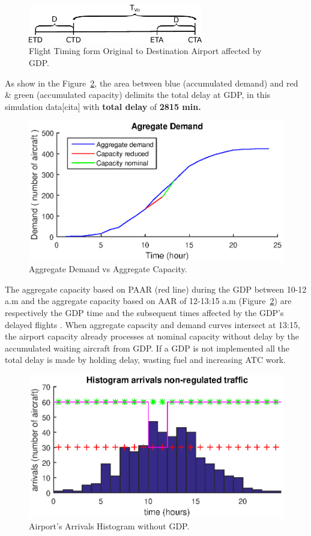 \documentclass[final,1p]{elsarticle}
\begin{document}
 \begin{figure}[h]
 \centering
 \includegraphics[width=3in]{./figs/a.eps}
 \caption{Flight Timing form Original to Destination Airport affected by GDP.}
 \label{f:a}
 \end{figure} 
 
As show in the Figure~\ref{f:agregate}, the area between blue (accumulated demand) and red \& green (accumulated capacity) delimits the total delay at GDP, in this simulation data[cita] with \textbf{total delay} of \textbf{2815 min.}

 \begin{figure}[h]
 \centering
 \includegraphics[width=4.5in]{./figs/agregate.eps}
 \caption{Aggregate Demand vs Aggregate Capacity.}
 \label{f:agregate}
 \end{figure} 
 
The aggregate capacity based on PAAR (red line) during the GDP between 10-12 a.m and the aggregate capacity based on AAR of 12-13:15 a.m (Figure~\ref{f:agregate}) are respectively the GDP time and the subsequent times affected by the GDP's delayed flights . When aggregate capacity and demand curves intersect at 13:15, the airport capacity already processes at nominal capacity without delay by the accumulated waiting aircraft from GDP. If a GDP is not implemented all the total delay is made by holding delay, wasting fuel and increasing ATC work.

 \begin{figure}[!hbt]
 \centering
 \includegraphics[width=4.5in]{./figs/agregatedemand.eps}
 \caption{Airport's Arrivals Histogram without GDP.}
 \label{f:histogram}
 \end{figure}
     
\end{document}
